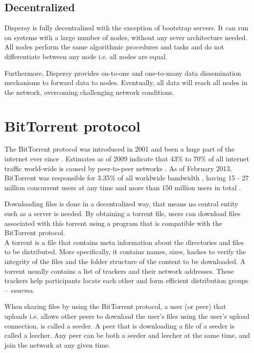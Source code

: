 \subsection{Decentralized}
Dispersy is fully decentralized with the exception of bootstrap servers.
It can run on systems with a large number of nodes, without any sever architecture needed.
All nodes perform the same algorithmic procedures and tasks and do not differentiate between any node i.e. all nodes are equal.

Furthermore, Dispersy provides on-to-one and one-to-many data dissemination mechanisms to forward data to nodes.
Eventually, all data will reach all nodes in the network, overcoming challenging network conditions.

\section{BitTorrent protocol}
The BitTorrent protocol was introduced in 2001 and been a huge part of the internet ever since \cite{Cohen2001BitTorrent}.
Estimates as of 2009 indicate that 43\% to 70\% of all internet traffic world-wide is caused by peer-to-peer networks \cite{schulze2009internet}.
As of February 2013, BitTorrent was responsible for 3.35\% of all worldwide bandwidth \cite{palo2013application}, having 15 - 27 million concurrent users at any time \cite{wang2013measuring} and more than 150 million users in total \cite{reuters2012bittorrent}.

Downloading files is done in a decentralized way, that means no central entity such as a server is needed.
By obtaining a torrent file, users can download files associated with this torrent using a program that is compatible with the BitTorrent protocol.\\

A torrent is a file that contains meta information about the directories and files to be distributed.
More specifically, it contains names, sizes, hashes to verify the integrity of the files and the folder structure of the content to be downloaded.
A torrent usually contains a list of trackers and their network addresses.
These trackers help participants locate each other and form efficient distribution groups -- \emph{swarms}.
 

When sharing files by using the BitTorrent protocol, a user (or peer) that uploads i.e. allows other peers to download the user's files using the user's upload connection, is called a seeder.
A peer that is downloading a file of a seeder is called a leecher.
Any peer can be both a seeder and leecher at the same time, and join the network at any given time.\\

